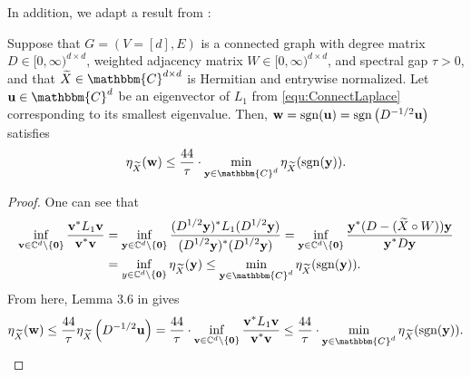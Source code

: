 

In addition, we adapt a result from \cite{Cheeger}:

\begin{lemma}  
Suppose that $G = (V=[d], E)$ is a connected graph with degree matrix $D \in [0,\infty)^{d \times d}$, weighted adjacency matrix $W \in [0,\infty)^{d \times d}$, and spectral gap $\tau > 0$, and that $\tX \in \mathbbm{C}^{d \times d}$ is Hermitian and entrywise normalized.  Let ${\bf u} \in \mathbbm{C}^d$ be an eigenvector of $L_1$ from \eqref{equ:ConnectLaplace} corresponding to its smallest eigenvalue.  Then, ${\bf w} = \mathrm{sgn}({\bf u}) = \mathrm{sgn} \left( D^{-1/2}{\bf u} \right)$ satisfies \[\eta_{\tX}({\bf w}) \le \bigfrac{44}{\tau} \cdot \min_{\y \in \mathbbm{C}^d} \eta_{\tX}( \sgn(\y) ).\]
\label{lem:CheegerInequality}
\end{lemma}

\begin{proof}  
 One can see that 
\begin{align*}
\inf_{\v \in \C^d \setminus \{ \bf 0 \}} \bigfrac{\v^* L_1 \v}{\v^* \v} &= \inf_{\y \in \C^d \setminus \{ \bf 0 \}} \bigfrac{(D^{1/2}\y)^* L_1 (D^{1/2} \y)}{(D^{1/2}\y)^*(D^{1/2} \y)} = \inf_{\y \in \C^d \setminus \{ \bf 0 \} } \bigfrac{\y^*(D - (\tX \circ W))\y}{\y^* D \y } \\
&= \inf_{y \in \C^d \setminus \{ \bf 0 \}} \eta_{\tX}(\y) \le \min_{\y \in \mathbbm{C}^d} \eta_{\tX}( \sgn(\y) ).  
\end{align*}
From here, Lemma 3.6 in \cite{Cheeger} gives \[\eta_{\tX}({\bf w}) \le \bigfrac{44}{\tau} \eta_{\tX}\left( D^{-1/2}{\bf u} \right) = \bigfrac{44}{\tau} \cdot \inf_{\v \in \C^d \setminus \{ \bf 0 \}} \bigfrac{\v^* L_1 \v}{\v^* \v} \le \bigfrac{44}{\tau} \cdot \min_{\y \in \mathbbm{C}^d} \eta_{\tX}( \sgn(\y) ).\]
\end{proof}

